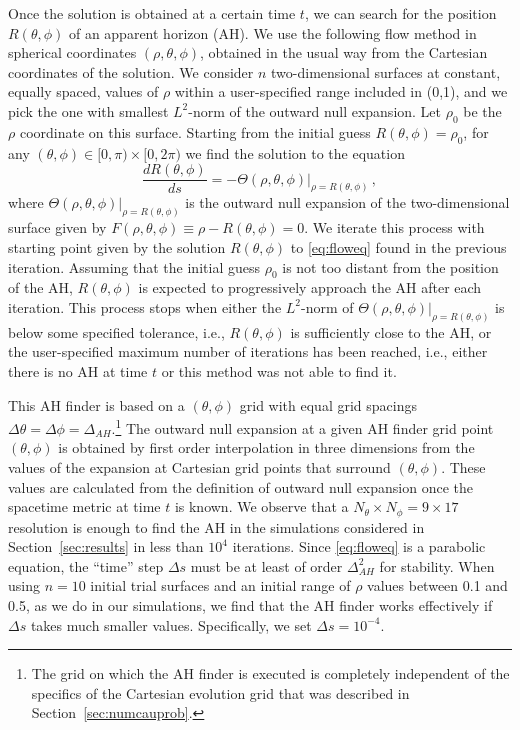 \documentclass[aps,letterpaper,twocolumn,nofootinbib]{revtex4}
\numberwithin{equation}{section}
\begin{document}
Once the solution is obtained at a certain time $t$, we can search for the position $R(\theta,\phi)$ of an apparent horizon (AH). We use the following flow method in spherical coordinates $(\rho,\theta,\phi)$, obtained in the usual way from the Cartesian coordinates of the solution. We consider $n$ two-dimensional surfaces at constant, equally spaced, values of $\rho$ within a user-specified range included in (0,1), and we pick the one with smallest $L^2$-norm of the outward null expansion. Let $\rho_0$ be the $\rho$ coordinate on this surface. 
Starting from the initial guess $R(\theta,\phi)=\rho_0$, for any $(\theta,\phi)\in [0,\pi)\times [0,2\pi)$ we find the solution to the equation
\begin{equation}
\label{eq:floweq}
\frac{dR(\theta,\phi)}{d s}=-\Theta(\rho,\theta,\phi)|_{\rho=R(\theta,\phi)}\,,
\end{equation}
where $\Theta(\rho,\theta,\phi)|_{\rho=R(\theta,\phi)}$ is the outward null expansion of the two-dimensional surface given by $F(\rho,\theta,\phi)\equiv\rho-R(\theta,\phi)=0$. We iterate this process with starting point given by the solution $R(\theta,\phi)$ to \eqref{eq:floweq} found in the previous iteration. Assuming that the initial guess $\rho_0$ is not too distant from the position of the AH, $R(\theta,\phi)$ is expected to progressively approach the AH after each iteration. 
This process stops when either the $L^2$-norm of $\Theta(\rho,\theta,\phi)|_{\rho=R(\theta,\phi)}$ is below some specified tolerance, i.e., $R(\theta,\phi)$ is sufficiently close to the AH, or the user-specified maximum number of iterations has been reached, i.e., either there is no AH at time $t$ or this method was not able to find it. 

This AH finder is based on a $(\theta,\phi)$ grid with equal grid spacings $\Delta \theta=\Delta\phi=\Delta_{AH}$.\footnote{The grid on which the AH finder is executed is completely independent of the specifics of the Cartesian evolution grid that was described in Section~\ref{sec:numcauprob}.} 
The outward null expansion at a given AH finder grid point $(\theta,\phi)$ is obtained by first order interpolation in three dimensions from the values of the expansion at Cartesian grid points that surround $(\theta,\phi)$.
These values are calculated from the definition of outward null expansion once the spacetime metric at time $t$ is known.
We observe that a $N_\theta\times N_\phi=9\times 17$ resolution is enough to find the AH in the simulations considered in Section~\ref{sec:results} in less than $10^{4}$ iterations. Since \eqref{eq:floweq} is a parabolic equation, the ``time'' step $\Delta s$ must be at least of order $\Delta_{AH}^2$ for stability. When using $n=10$ initial trial surfaces and an initial range of $\rho$ values between 0.1 and 0.5, as we do in our simulations, we find that the AH finder works effectively if $\Delta s$ takes much smaller values. Specifically, we set $\Delta s=10^{-4}$.
\end{document}
